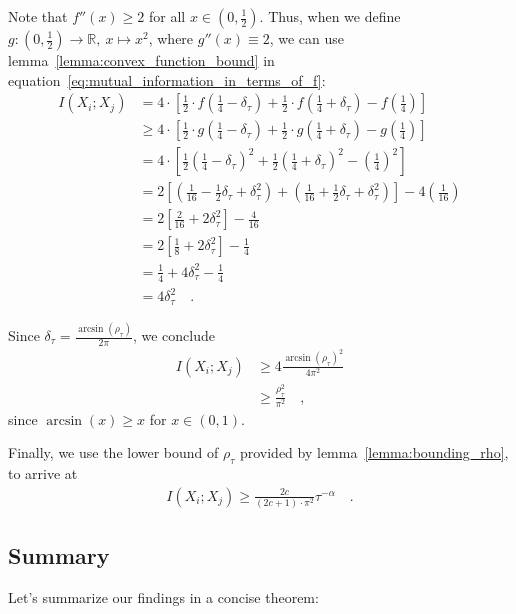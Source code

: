 \documentclass[../../main.tex]{subfiles}
\begin{document}
Note that $f''(x) \geq 2$ for all $x \in (0, \frac{1}{2})$. Thus, when we define $g: (0, \frac{1}{2}) \to \mathbb{R}, \ x \mapsto x^2$, where $g''(x) \equiv 2$, we can use lemma~\ref{lemma:convex_function_bound} in equation~\eqref{eq:mutual_information_in_terms_of_f}:
\begin{align*}
    I(X_i; X_j) &= 4 \cdot \left[ \frac{1}{2} \cdot f(\frac{1}{4} - \delta_\tau) + \frac{1}{2} \cdot f(\frac{1}{4} + \delta_\tau) - f(\frac{1}{4}) \right] \\
    &\geq 4 \cdot \left[ \frac{1}{2} \cdot g(\frac{1}{4} - \delta_\tau) + \frac{1}{2} \cdot g(\frac{1}{4} + \delta_\tau) - g(\frac{1}{4}) \right] \\
    &= 4 \cdot \left[ \frac{1}{2} \left(\frac{1}{4} - \delta_\tau\right)^2 + \frac{1}{2} \left(\frac{1}{4} + \delta_\tau\right)^2 - \left(\frac{1}{4}\right)^2 \right] \\
    &= 2 \left[ \left(\frac{1}{16} - \frac{1}{2}\delta_\tau + \delta_\tau^2\right) + \left(\frac{1}{16} + \frac{1}{2}\delta_\tau + \delta_\tau^2\right) \right] - 4\left(\frac{1}{16}\right) \\
    &= 2 \left[ \frac{2}{16} + 2\delta_\tau^2 \right] - \frac{4}{16} \\
    &= 2 \left[ \frac{1}{8} + 2\delta_\tau^2 \right] - \frac{1}{4} \\
    &= \frac{1}{4} + 4\delta_\tau^2 - \frac{1}{4} \\
    &= 4\delta_\tau^2 \quad .
\end{align*}

Since $\delta_\tau = \frac{\arcsin(\rho_\tau)}{2\pi}$, we conclude
\begin{align*}
    I(X_i; X_j) &\geq 4 \frac{\arcsin(\rho_\tau)^2}{4\pi^2} \\
    &\geq \frac{\rho_\tau^2}{\pi^2} \quad ,
\end{align*}
since $\arcsin(x) \geq x$ for $x \in (0, 1)$.

Finally, we use the lower bound of $\rho_\tau$ provided by lemma~\ref{lemma:bounding_rho}, to arrive at
\begin{align*}
    I(X_i; X_j) \geq \frac{2c}{(2c + 1) \cdot \pi^2} \tau^{-\alpha} \quad .
\end{align*}

\pagebreak
\subsection{Summary}
Let's summarize our findings in a concise theorem:
\end{document}
